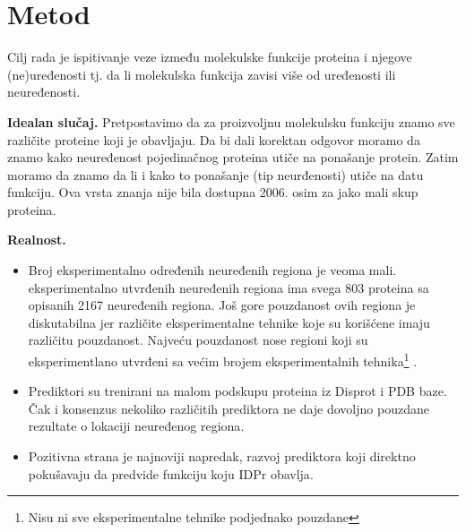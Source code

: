 \section {Metod}

Cilj rada je ispitivanje veze između molekulske funkcije proteina i njegove
(ne)uređenosti tj. da li molekulska funkcija zavisi više od uređenosti ili
neuređenosti.

\textbf{Idealan slučaj.} 
Pretpostavimo da za proizvoljnu molekulsku funkciju znamo sve različite
proteine koji je obavljaju.  Da bi dali korektan odgovor  moramo da znamo kako
neuređenost pojedinačnog proteina utiče na ponašanje protein.  Zatim moramo da
znamo da li i kako to ponašanje (tip neurđenosti) utiče na datu funkciju.
Ova vrsta znanja nije bila dostupna 2006. osim za jako mali skup proteina.

\textbf{Realnost.} 
\begin{itemize}
  \item Broj eksperimentalno određenih neuređenih regiona je veoma mali.
     eksperimentalno utvrđenih neuređenih regiona ima
    svega 803 proteina sa opisanih 2167 neuređenih regiona\parencite{disprot7}.
    Još gore pouzdanost ovih regiona je diskutabilna jer različite
    eksperimentalne tehnike koje su korišćene imaju različitu pouzdanost.
    Najveću pouzdanost nose regioni koji su eksperimentlano utvrđeni sa 
    većim brojem eksperimentalnih tehnika\footnote{Nisu ni sve eksperimentalne
    tehnike podjednako pouzdane} \parencite{disprot7}. 
  \item Prediktori su trenirani na malom podskupu proteina iz Disprot i PDB  baze.
    Čak i konsenzus nekoliko različitih prediktora ne daje dovoljno pouzdane
    rezultate o lokaciji neuređenog regiona\parencite{Mitic}.
  \item 
    Pozitivna strana je najnoviji napredak, razvoj prediktora koji direktno
    pokušavaju da predvide funkciju koju IDPr obavlja\parencite{meng_c20017}.

\end{itemize}

